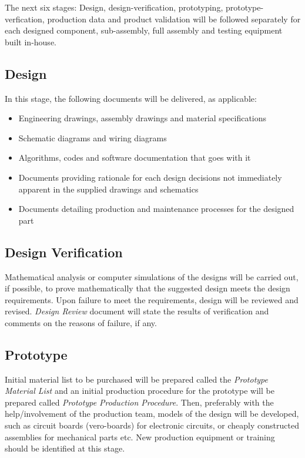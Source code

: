 \documentclass[a4paper,10pt]{article}
\begin{document}
The next six stages: Design, design-verification, prototyping, prototype-verfication, production data and product validation will be 
followed separately for each designed component, sub-assembly, full assembly and testing equipment built in-house.

\subsection{Design}
In this stage, the following documents will be delivered, as applicable:
\begin{itemize}
 \item Engineering drawings, assembly drawings and material specifications
 \item Schematic diagrams and wiring diagrams
 \item Algorithms, codes and software documentation that goes with it
 \item Documents providing rationale for each design decisions not immediately apparent in the supplied drawings and schematics
 \item Documents detailing production and maintenance processes for the designed part
\end{itemize}

\subsection{Design Verification}
Mathematical analysis or computer simulations of the designs will be carried out, if possible, to prove mathematically that the suggested design meets the 
design requirements. Upon failure to meet the requirements, design will be reviewed and revised. \emph{Design Review} document will
state the results of verification and comments on the reasons of failure, if any.

\subsection{Prototype}
Initial material list to be purchased will be prepared called the \emph{Prototype Material List} and an initial production procedure
for the prototype will be prepared called \emph{Prototype Production Procedure}. Then, preferably with the help/involvement of the production team, models of the design will be developed, such as circuit boards (vero-boards) for electronic circuits, or cheaply constructed assemblies for mechanical parts etc. New production equipment or training should be identified at this stage.
\end{document}
